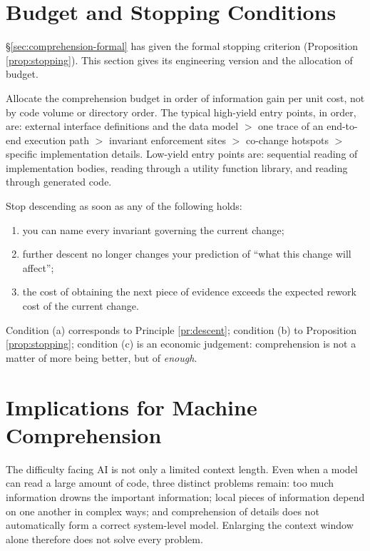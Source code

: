 \section{Budget and Stopping Conditions}\label{sec:budget}

\S\ref{sec:comprehension-formal} has given the formal stopping criterion (Proposition
\ref{prop:stopping}). This section gives its engineering version and the allocation of budget.

\begin{principle}\label{pr:descent-budget}
Allocate the comprehension budget in order of information gain per unit cost, not by code
volume or directory order. The typical high-yield entry points, in order, are: external
interface definitions and the data model $>$ one trace of an end-to-end execution path $>$
invariant enforcement sites $>$ co-change hotspots $>$ specific implementation details.
Low-yield entry points are: sequential reading of implementation bodies, reading through a
utility function library, and reading through generated code.
\end{principle}

\begin{principle}\label{pr:stop}
Stop descending as soon as any of the following holds:
\begin{enumerate}[label=(\alph*)]
\item you can name every invariant governing the current change;
\item further descent no longer changes your prediction of ``what this change will affect'';
\item the cost of obtaining the next piece of evidence exceeds the expected rework cost of the
      current change.
\end{enumerate}
\end{principle}

Condition (a) corresponds to Principle \ref{pr:descent}; condition (b) to Proposition
\ref{prop:stopping}; condition (c) is an economic judgement: comprehension is not a matter of
more being better, but of \emph{enough}.

\section{Implications for Machine Comprehension}\label{sec:ai-comprehension}

The difficulty facing AI is not only a limited context length. Even when a model can read a
large amount of code, three distinct problems remain: too much information drowns the
important information; local pieces of information depend on one another in complex ways; and
comprehension of details does not automatically form a correct system-level model. Enlarging
the context window alone therefore does not solve every problem.

